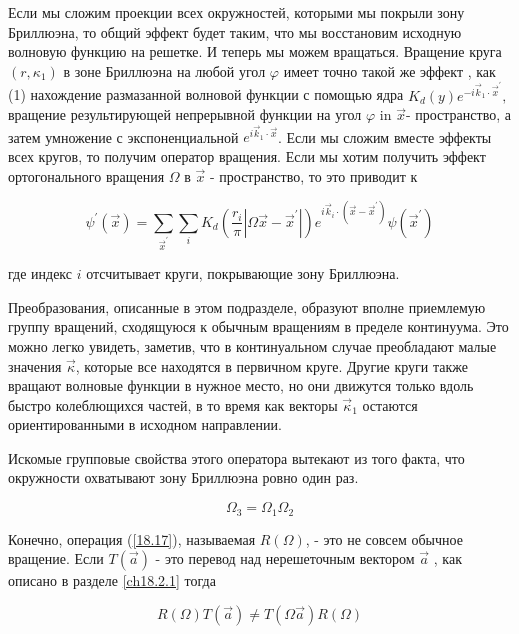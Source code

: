 \documentclass[main.tex]{subfiles}
\begin{document}
Если мы сложим проекции всех окружностей, которыми мы покрыли зону Бриллюэна, то общий эффект будет таким, что мы восстановим исходную волновую функцию на решетке. И теперь мы можем вращаться. Вращение круга $\left (r, \kappa_{1}\right)$ в зоне Бриллюэна на любой угол $\varphi$ имеет точно такой же эффект , как (1) нахождение размазанной волновой функции с помощью ядра $K_{d}(y) e^{-i \vec{k}_{1} \cdot \vec{x}^{\prime}},$ вращение результирующей непрерывной функции на угол $\varphi$ in $\vec{x}$- пространство, а затем умножение с экспоненциальной $e^{i \vec{k}_{1} \cdot \vec{x}}$. Если мы сложим вместе эффекты всех кругов, то получим оператор вращения. Если мы хотим получить эффект ортогонального вращения $\Omega$ в $\vec{x}$ - пространство, то это приводит к


\begin{equation}\label{18.17}
	\psi^{\prime}(\vec{x})=\sum_{\vec{x}^{\prime}} \sum_{i} K_{d}\left(\frac{r_{i}}{\pi}\left|\Omega \vec{x}-\vec{x}^{\prime}\right|\right) e^{i \vec{k}_{i} \cdot\left(\vec{x}-\vec{x}^{\prime}\right)} \psi\left(\vec{x}^{\prime}\right)
\end{equation}

где индекс $i$ отсчитывает круги, покрывающие зону Бриллюэна.

Преобразования, описанные в этом подразделе, образуют вполне приемлемую группу вращений, сходящуюся к обычным вращениям в пределе континуума. Это можно легко увидеть, заметив, что в континуальном случае преобладают малые значения $\vec{\kappa}$, которые все находятся в первичном круге. Другие круги также вращают волновые функции в нужное место, но они движутся только вдоль быстро колеблющихся частей, в то время как векторы $\vec{\kappa}_{1}$ остаются ориентированными в исходном направлении.

Искомые групповые свойства этого оператора вытекают из того факта, что окружности охватывают зону Бриллюэна ровно один раз.

\begin{equation}\label{18.18}
	\Omega_{3}=\Omega_{1} \Omega_{2}
\end{equation}


Конечно, операция (\ref{18.17}), называемая $R(\Omega)$, - это не совсем обычное вращение. Если $T (\vec{a})$ - это перевод над нерешеточным вектором $\vec{a}$ , как описано в разделе \ref{ch18.2.1} тогда

\begin{equation}\label{18.19}
	R(\Omega) T(\vec{a}) \neq T(\Omega \vec{a}) R(\Omega)
\end{equation}
\end{document}
